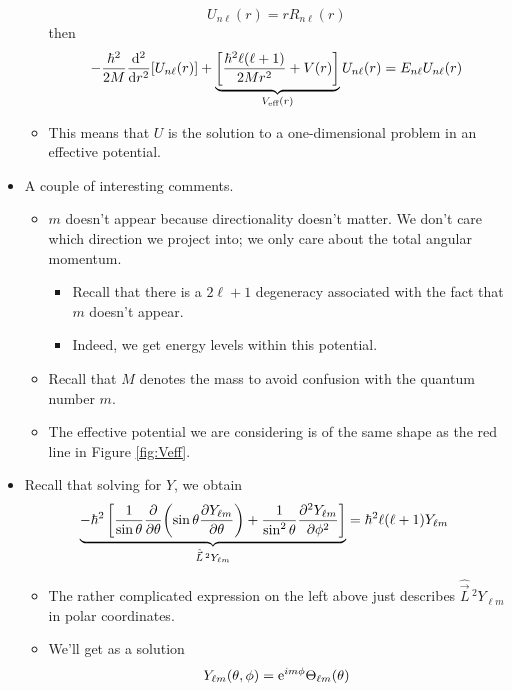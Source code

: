 \documentclass[../notes.tex]{subfiles}
\begin{document}
\begin{itemize}
\begin{itemize}
\begin{equation*}
            U_{n\ell}(r) = rR_{n\ell}(r)
        \end{equation*}
        then
        \begin{equation*}
            -\frac{\hbar^2}{2M}\dv[2]{r}[U_{n\ell}(r)]+\underbrace{\left[ \frac{\hbar^2\ell(\ell+1)}{2Mr^2}+V(r) \right]}_{V_\text{eff}(r)}U_{n\ell}(r) = E_{n\ell}U_{n\ell}(r)
        \end{equation*}
        \item This means that $U$ is the solution to a one-dimensional problem in an effective potential.
    \end{itemize}
    \item A couple of interesting comments.
    \begin{itemize}
        \item $m$ doesn't appear because directionality doesn't matter. We don't care which direction we project into; we only care about the total angular momentum.
        \begin{itemize}
            \item Recall that there is a $2\ell+1$ degeneracy associated with the fact that $m$ doesn't appear.
            \item Indeed, we get energy levels within this potential.
        \end{itemize}
        \item Recall that $M$ denotes the mass to avoid confusion with the quantum number $m$.
        \item The effective potential we are considering is of the same shape as the red line in Figure \ref{fig:Veff}.
    \end{itemize}
    \item Recall that solving for $Y$, we obtain
    \begin{equation*}
        \underbrace{-\hbar^2\left[ \frac{1}{\sin\theta}\pdv{\theta}(\sin\theta\pdv{Y_{\ell m}}{\theta})+\frac{1}{\sin^2\theta}\pdv[2]{Y_{\ell m}}{\phi} \right]}_{\hat{\vec{L}}{\,}^2Y_{\ell m}} = \hbar^2\ell(\ell+1)Y_{\ell m}
    \end{equation*}
    \begin{itemize}
        \item The rather complicated expression on the left above just describes $\hat{\vec{L}}{\,}^2Y_{\ell m}$ in polar coordinates.
        \item We'll get as a solution
        \begin{equation*}
            Y_{\ell m}(\theta,\phi) = \e[im\phi]\Theta_{\ell m}(\theta)

\end{equation*}
\end{itemize}
\end{itemize}
\end{document}
